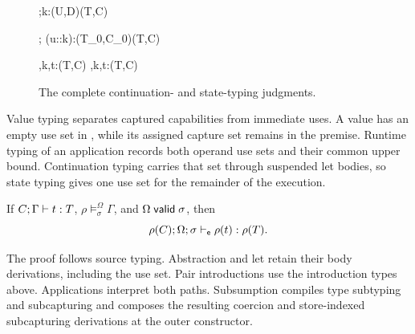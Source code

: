 \documentclass[acmsmall,screen,nonacm]{acmart}
\begin{document}
\begin{figure}[H]
 {\Omega;\sigma\vdash k:(U,D)\Rightarrow(T,C)}
\noindent
\begin{minipage}[t]{0.39\linewidth}
\end{minipage}\hfill
\begin{minipage}[t]{0.58\linewidth}
  {\Omega;\sigma\vdash
   (u::k):(T_0,C_0)\Rightarrow(T,C)}
\end{minipage}

 {\Omega\models\langle\sigma,k,t\rangle:(T,C)}
  {\Omega\models\langle\sigma,k,t\rangle:(T,C)}

\caption{The complete continuation- and state-typing judgments.}
\label{fig:machine-typing}
\end{figure}

\endgroup

Value typing separates captured capabilities from immediate uses. A value has
an empty use set in , while its assigned capture set remains in the
premise. Runtime typing of an application records both operand use sets and
their common upper bound. Continuation typing carries that set through
suspended let bodies, so state typing gives one use set for the remainder of
the execution.

\begin{lemma}
\label{lem:source-interpretation}
If \({C}; {\Gamma}\vdash {t} : {T}\),
\(\rho\models^\Omega_\sigma\Gamma\), and \(\Omega\mathrel{\mathsf{valid}}\sigma\), then
\[
 {\rho(C)}; {\Omega;\sigma}\vdash_{\mathsf e} {\rho(t)} : {\rho(T)}.
\]
\end{lemma}

The proof follows source typing.  Abstraction and let retain their body
derivations, including the use set.  Pair introductions use the
introduction types above. Applications interpret both paths. Subsumption
compiles type subtyping and subcapturing and composes the resulting coercion
and store-indexed subcapturing derivations at the outer constructor.
\end{document}
